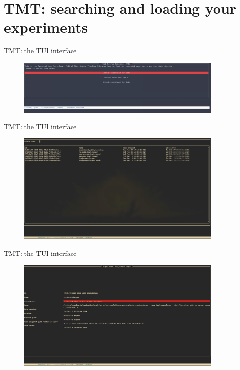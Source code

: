 \documentclass[aspectratio=169,xcolor={dvipsnames}]{beamer}
\begin{document}
  \section{TMT: searching and loading your experiments }
  \begin{frame}{TMT: the TUI interface}
   \begin{figure}
    \includegraphics[width=0.90\textwidth]{main_tui.png}
   \end{figure} 
  \end{frame}
  \begin{frame}{TMT: the TUI interface}
   \begin{figure}
    \includegraphics[width=0.90\textwidth]{tmt_search.png}
   \end{figure} 
  \end{frame}
  \begin{frame}{TMT: the TUI interface}
   \begin{figure}
    \includegraphics[width=0.90\textwidth]{detail_tui.png}
   \end{figure} 
  \end{frame}
\end{document}
